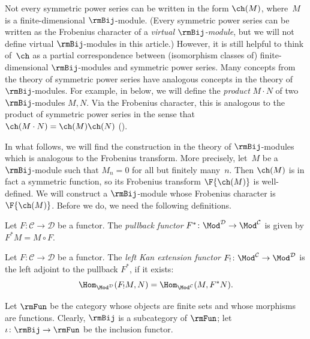 Not every symmetric power series can be written in the form $\ch(M)$, where~$M$ is a finite-dimensional $\rmBij$-module. (Every symmetric power series can be written as the Frobenius character of a \emph{virtual $\rmBij$-module}, but we will not define virtual $\rmBij$-modules in this article.) However, it is still helpful to think of~$\ch$ as a partial correspondence between (isomorphism classes of) finite-dimensional $\rmBij$-modules and symmetric power series. Many concepts from the theory of symmetric power series have analogous concepts in the theory of $\rmBij$-modules. For example, in  below, we will define the \emph{product} $M \cdot N$ of two $\rmBij$-modules $M, N$. Via the Frobenius character, this is analogous to the product of symmetric power series in the sense that $\ch(M \cdot N) = \ch(M) \ch(N)$ ().

In what follows, we will find the construction in the theory of $\rmBij$-modules which is analogous to the Frobenius transform. More precisely, let~$M$ be a $\rmBij$-module such that $M_n = 0$ for all but finitely many~$n$. Then $\ch(M)$ is in fact a symmetric function, so its Frobenius transform $\F{\ch(M)}$ is well-defined. We will construct a $\rmBij$-module whose Frobenius character is $\F{\ch(M)}$. Before we do, we need the following definitions.

\begin{defi}[{\cite[Definition~2.6.1]{MR3641124}}]
    Let $F \colon \mathcal{C} \to \mathcal{D}$ be a functor. The \emph{pullback functor} $F^* \colon \Mod^\mathcal{D} \to \Mod^\mathcal{C}$ is given by $F^*M = M \circ F$.
\end{defi}
\begin{defi}[{\cite[Proposition~2.6.2]{MR3641124}}]
    Let $F \colon \mathcal{C} \to \mathcal{D}$ be a functor. The \emph{left Kan extension functor} $F_! \colon \Mod^\mathcal{C} \to \Mod^\mathcal{D}$ is the left adjoint to the pullback $F^*$, if it exists:
    \[\Hom_{\Mod^\mathcal{D}}(F_! M, N) = \Hom_{\Mod^\mathcal{C}}(M, F^*N).\]
\end{defi}

Let $\rmFun$ be the category whose objects are finite sets and whose morphisms are functions. Clearly, $\rmBij$ is a subcategory of $\rmFun$; let $\iota \colon \rmBij \to \rmFun$ be the inclusion functor.

